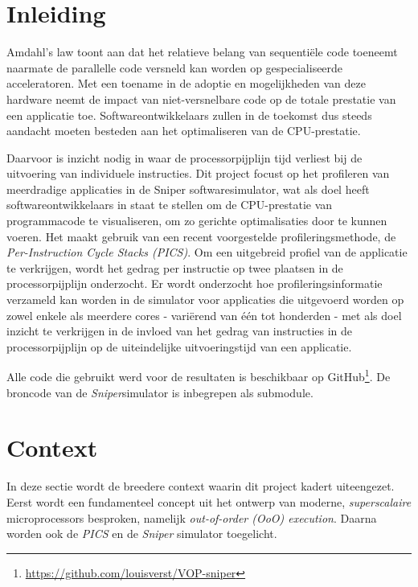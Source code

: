 \documentclass[12pt,a4paper,faculty=ea,language=nl]{ugent-doc}
\begin{document}
\maketitle

{\hypersetup{hidelinks}\tableofcontents}
\newpage

\section{Inleiding}
Amdahl's law toont aan dat het relatieve belang van sequentiële code toeneemt naarmate de parallelle code versneld kan worden op gespecialiseerde acceleratoren. Met een toename in de adoptie en mogelijkheden van deze hardware neemt de impact van niet-versnelbare code op de totale prestatie van een applicatie toe. Softwareontwikkelaars zullen in de toekomst dus steeds aandacht moeten besteden aan het optimaliseren van de CPU-prestatie.

Daarvoor is inzicht nodig in waar de processorpijplijn tijd verliest bij de uitvoering van individuele instructies. Dit project focust op het profileren van meerdradige applicaties in de Sniper softwaresimulator, wat als doel heeft softwareontwikkelaars in staat te stellen om de CPU-prestatie van programmacode te visualiseren, om zo gerichte optimalisaties door te kunnen voeren. Het maakt gebruik van een recent voorgestelde profileringsmethode, de \textit{Per-Instruction Cycle Stacks (PICS)}. Om een uitgebreid profiel van de applicatie te verkrijgen, wordt het gedrag per instructie op twee plaatsen in de processorpijplijn onderzocht. Er wordt onderzocht hoe profileringsinformatie verzameld kan worden in de simulator voor applicaties die uitgevoerd worden op zowel enkele als meerdere cores - variërend van één tot honderden - met als doel inzicht te verkrijgen in de invloed van het gedrag van instructies in de processorpijplijn op de uiteindelijke uitvoeringstijd van een applicatie.

Alle code die gebruikt werd voor de resultaten is beschikbaar op GitHub\footnote{\url{https://github.com/louisverst/VOP-sniper}}. De broncode van de \textit{Sniper}simulator is inbegrepen als submodule.


\newpage


\section{Context}
In deze sectie wordt de breedere context waarin dit project kadert uiteengezet. Eerst wordt een fundamenteel concept uit het ontwerp van moderne, \textit{superscalaire} microprocessors besproken, namelijk \textit{out-of-order (OoO) execution}. Daarna worden ook de \textit{PICS} en de \textit{Sniper} simulator toegelicht.
\end{document}
